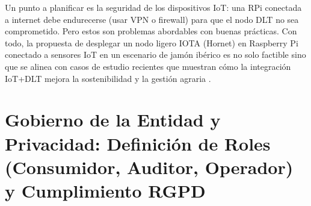 Un punto a planificar es la seguridad de los dispositivos IoT: una RPi conectada a internet debe endurecerse (usar VPN o firewall) para que el nodo DLT no sea comprometido. Pero estos son problemas abordables con buenas prácticas. Con todo, la propuesta de desplegar un nodo ligero IOTA (Hornet) en Raspberry Pi conectado a sensores IoT en un escenario de jamón ibérico es no solo factible sino que se alinea con casos de estudio recientes que muestran cómo la integración IoT+DLT mejora la sostenibilidad y la gestión agraria \cite{pullo_integrating_2024}.


\section{Gobierno de la Entidad y Privacidad: Definición de Roles (Consumidor, Auditor, Operador) y Cumplimiento RGPD}\label{sec:diseño-gobierno}